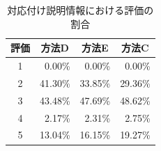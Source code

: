 \documentclass[submit,techrep,noauthor]{ipsj}
\begin{document}

\begin{table}[t]
  \caption{対応付け説明情報における評価の割合}
  \label{table:対応付け説明情報における評価の割合}
  \centering
  \begin{tabular}{c|r|r|r}
  \hline
  評価 & \multicolumn{1}{c|}{方法D} & \multicolumn{1}{c|}{方法E} & \multicolumn{1}{c}{方法C} \\ \hline
  1  & 0.00\%                     & 0.00\%                     & 0.00\% \\
  2  & 41.30\%                    & 33.85\%                    & 29.36\% \\
  3  & 43.48\%                    & 47.69\%                    & 48.62\% \\
  4  & 2.17\%                     & 2.31\%                     & 2.75\% \\
  5  & 13.04\%                    & 16.15\%                    & 19.27\% \\ \hline
  \end{tabular}
\end{table}
\end{document}
